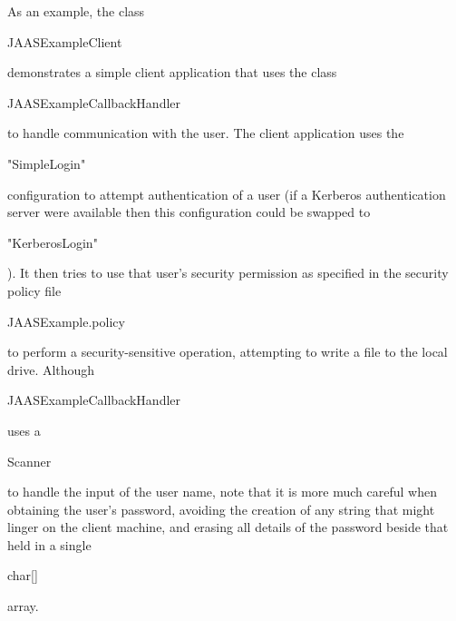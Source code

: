 As an example, the class \begin{code}JAASExampleClient\end{code}
demonstrates a simple client application that uses the
class \begin{code}JAASExampleCallbackHandler\end{code} to handle
communication with the user.
The client application uses the \begin{code}"SimpleLogin"\end{code}
configuration to attempt authentication of a user
(if a Kerberos authentication server were available then this
configuration could be swapped to \begin{code}"KerberosLogin"\end{code}).
It then tries to use that user's security permission as specified in
the security policy file \begin{code}JAASExample.policy\end{code}
to perform a security-sensitive operation, attempting to write a file
to the local drive.
Although \begin{code}JAASExampleCallbackHandler\end{code}
uses a \begin{code}Scanner\end{code} to handle the input of the
user name, note that it is more much careful when obtaining the user's
password, avoiding the creation of any string that might linger
on the client machine, and erasing all details of the password beside
that held in a single \begin{code}char[]\end{code} array.
